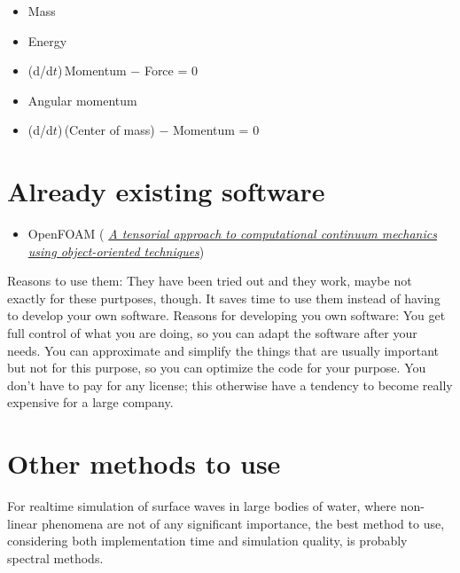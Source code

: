 \begin{itemize}
    \item Mass
    \item Energy
    \item (d/d$t$)\,Momentum $-$ Force = 0
    \item Angular momentum
    \item (d/d$t$)\,(Center of mass) $-$ Momentum = 0
\end{itemize}

\section{Already existing software}

\begin{itemize}
    \item OpenFOAM ( \textit{\href{http://powerlab.fsb.hr/ped/kturbo/openfoam/docs/foam.pdf}{A tensorial approach to computational continuum mechanics using object-oriented techniques}})
\end{itemize}

Reasons to use them: They have been tried out and they work, maybe not exactly for these purtposes, though. It saves time to use them instead of having to develop your own software. Reasons for developing you own software: You get full control of what you are doing, so you can adapt the software after your needs. You can approximate and simplify the things that are usually important but not for this purpose, so you can optimize the code for your purpose. You don't have to pay for any license; this otherwise have a tendency to become really expensive for a large company.

\section{Other methods to use}

For realtime simulation of surface waves in large bodies of water, where non-linear phenomena are not of any significant importance, the best method to use, considering both implementation time and simulation quality, is probably spectral methods.
